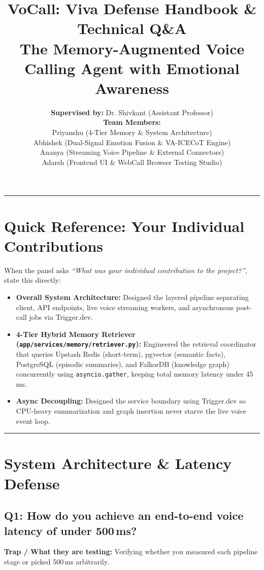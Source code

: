 \documentclass[11pt,a4paper]{article}
\title{\textbf{VoCall: Viva Defense Handbook \& Technical Q\&A}\\
\large The Memory-Augmented Voice Calling Agent with Emotional Awareness}
\author{\textbf{Supervised by:} Dr. Shivkant (Assistant Professor)\\[1ex]
\textbf{Team Members:}\\
Priyanshu (4-Tier Memory \& System Architecture)\\
Abhishek (Dual-Signal Emotion Fusion \& VA-ICECoT Engine)\\
Ananya (Streaming Voice Pipeline \& External Connectors)\\
Adarsh (Frontend UI \& WebCall Browser Testing Studio)}
\date{}
\begin{document}
\maketitle
\thispagestyle{empty}

\hrule
\vspace{1em}

\section*{Quick Reference: Your Individual Contributions}
When the panel asks \textit{``What was your individual contribution to the project?''}, state this directly:
\begin{itemize}
    \item \textbf{Overall System Architecture:} Designed the layered pipeline separating client, API endpoints, live voice streaming workers, and asynchronous post-call jobs via Trigger.dev.
    \item \textbf{4-Tier Hybrid Memory Retriever (\texttt{app/services/memory/retriever.py}):} Engineered the retrieval coordinator that queries Upstash Redis (short-term), pgvector (semantic facts), PostgreSQL (episodic summaries), and FalkorDB (knowledge graph) concurrently using \texttt{asyncio.gather}, keeping total memory latency under 45\,ms.
    \item \textbf{Async Decoupling:} Designed the service boundary using Trigger.dev so CPU-heavy summarization and graph insertion never starve the live voice event loop.
\end{itemize}

\vspace{1em}
\hrule
\vspace{1.5em}

\section{System Architecture \& Latency Defense}

\subsection*{Q1: How do you achieve an end-to-end voice latency of under 500\,ms?}
\textbf{Trap / What they are testing:} Verifying whether you measured each pipeline stage or picked 500\,ms arbitrarily.
\end{document}
